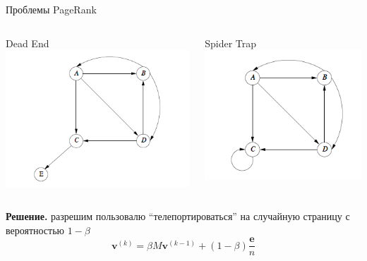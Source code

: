 \documentclass[10pt,a4paper]{beamer}
\begin{document}

\begin{frame}{Проблемы PageRank}

\begin{columns}[T]
	\begin{column}{.5\textwidth}
	\hspace{7em}Dead End	
    \includegraphics[scale=0.45]{images/de.png}
	\end{column}
    \begin{column}{.5\textwidth}
    \hspace{5em}Spider Trap
	\includegraphics[scale=0.45]{images/st.png}
    \end{column}    
\end{columns}

{\bf Решение.} разрешим пользовалю ``телепортироваться'' на случайную страницу с вероятностью $1 - \beta$
\[
\mathbf{v}^{(k)} = \beta M \mathbf{v}^{(k-1)} + (1 - \beta) \frac{\mathbf{e}}{n} 
\]

\end{frame}

\end{document}
